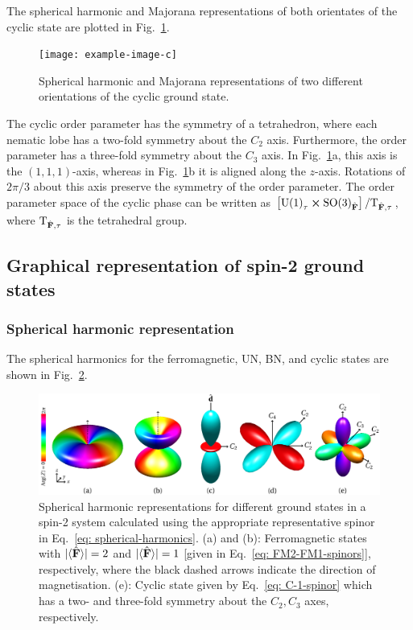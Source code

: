The spherical harmonic and Majorana representations of both orientates of the
cyclic state are plotted in Fig.~\ref{fig: cyclic-graph}.
\begin{figure}
    \centering
    \texttt{[image: example-image-c]}
    \caption[Spherical harmonic and Majorana representations of two different
    orientations of the cyclic ground state.]
    {\label{fig: cyclic-graph}Spherical harmonic and Majorana representations of
    two different orientations of the cyclic ground state.}
\end{figure}
The cyclic order parameter has the symmetry of a tetrahedron, where each nematic
lobe has a two-fold symmetry about the \(C_2\) axis.
Furthermore, the order parameter has a three-fold symmetry about the \(C_3\)
axis.
In Fig.~\ref{fig: cyclic-graph}a, this axis is the \((1, 1, 1)\)-axis, whereas
in Fig.~\ref{fig: cyclic-graph}b it is aligned along the \(z\)-axis.
Rotations of \(2\pi/3\) about this axis preserve the symmetry of the order
parameter.
The order parameter space of the cyclic phase can be written as
\(\left[{\text{U}(1)}_\tau \cross {\text{SO}(3)}_{\hat{\vb{F}}}\right]
/ \text{T}_{\hat{\vb{F}}, \tau}\), where \(\text{T}_{\hat{\vb{F}}, \tau}\) is
the tetrahedral group.

\subsection{Graphical representation of spin-2 ground states}
\subsubsection{Spherical harmonic representation}
The spherical harmonics for the ferromagnetic, UN, BN, and cyclic states
are shown in Fig.~\ref{fig: spin-2-spherical-harmonics}.
\begin{figure}
    \centering
    \includegraphics[width=\textwidth]
    {gfx/ch-groundStateSymmetries/spin-2-ground-states.pdf}
    \caption[Spherical harmonic representation of spin-2 ground states]
    {\label{fig: spin-2-spherical-harmonics}Spherical harmonic
        representations for different ground states in a spin-2 system
        calculated using the appropriate representative spinor in
        Eq.~\eqref{eq: spherical-harmonics}.
        (a) and (b): Ferromagnetic states with \(|\langle \hat{\vb{F}} \rangle |=2\) and
        \(|\langle \hat{\vb{F}} \rangle |=1\) [given in Eq.~\eqref{eq: FM2-FM1-spinors}], respectively,
        where the black dashed arrows indicate the direction of magnetisation.
        (e): Cyclic state given by Eq.~\eqref{eq: C-1-spinor} which has a
        two- and three-fold symmetry about the \(C_2, C_3\) axes, respectively.}
\end{figure}

